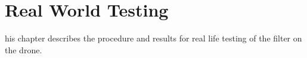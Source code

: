 \let\textcircled=\pgftextcircled
\chapter{Real World Testing}
\label{chap:irltesting}

his chapter describes the procedure and results for real life testing of the filter on the drone.
